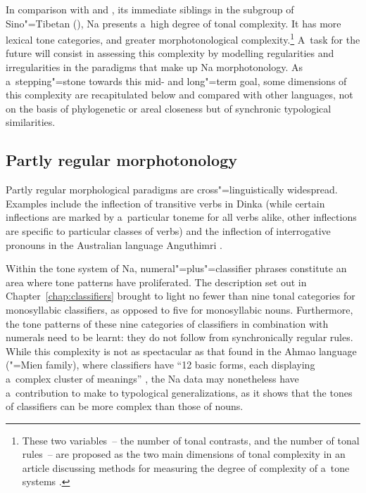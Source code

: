 
In comparison with  and , its immediate siblings in the  subgroup of Sino"=Tibetan (), Na presents a~high degree of tonal complexity. It has more lexical tone categories, and greater morphotonological complexity.\footnote{These two variables~-- the number of tonal contrasts, and the number of tonal rules~-- are proposed as the two main dimensions of tonal complexity in an article discussing methods for measuring the degree of complexity of a~tone systems \citep{konoshenko2014}.} A~task for the future will consist in assessing this complexity by modelling regularities and irregularities in the paradigms that make up Na morphotonology. %
As a~stepping"=stone towards this mid- and long"=term goal, some dimensions of this complexity are recapitulated below and compared with other languages, not on the basis of phylogenetic or areal closeness but of synchronic typological similarities.

\subsection{Partly regular morphotonology}
\label{sec:partlyregularmorphotonology}

Partly regular morphological paradigms are cross"=linguistically widespread. Examples include the inflection of transitive verbs in Dinka \citep[8]{andersen1993} (while certain inflections are marked by a~particular toneme for all
verbs alike, other inflections are specific to particular classes of verbs) and the inflection of interrogative pronouns in the Australian language Angu\-thimri \citep[172]{crowley1981}. 

Within the tone system of Na, numeral"=plus"=classifier phrases
constitute an area where tone patterns have proliferated. The description set out in Chapter~\ref{chap:classifiers} brought to light no fewer than nine tonal categories for {monosyllabic} classifiers, as opposed to five for {monosyllabic} nouns. Furthermore, the tone patterns of these nine categories of classifiers in combination with numerals need to be learnt: they do not follow from synchronically regular rules. While this complexity is not as spectacular as that found in the Ahmao language ("=Mien family), where classifiers have “12
basic forms, each displaying a~complex cluster of meanings” \citep{gerneretal2009}, the Na data may
nonetheless have a~contribution to make to typological generalizations, as it shows that the tones of classifiers can be more complex than those of nouns. 


